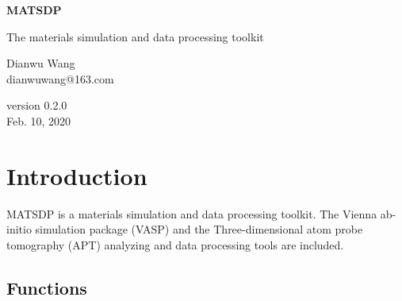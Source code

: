 \documentclass[12pt]{book}
\begin{document}

\begin{titlepage}
\begin{center}
\vspace*{1cm}

\Huge
\textbf{MATSDP}

\vspace{0.5cm}
\LARGE The materials simulation and data processing toolkit
\vspace{1.5cm}

\vfill

\small Dianwu Wang \\
\small dianwuwang@163.com \\
\vspace{0.8cm}

\small version 0.2.0\\
\small Feb. 10, 2020

\end{center}
\end{titlepage}

\tableofcontents

\chapter{Introduction}
MATSDP is a materials simulation and data processing toolkit. The Vienna ab-initio simulation package (VASP) and the Three-dimensional atom probe tomography (APT) analyzing and data processing tools are included. 

\section{Functions}
\end{document}
